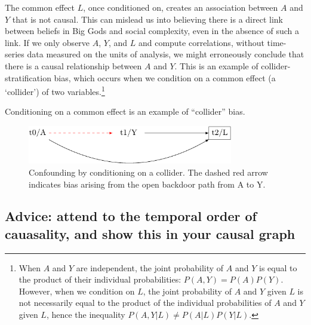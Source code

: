 \documentclass[
  singlecolumn]{report}
\begin{document}
The common effect \(L\), once conditioned on, creates an association
between \(A\) and \(Y\) that is not causal. This can mislead us into
believing there is a direct link between beliefs in Big Gods and social
complexity, even in the absence of such a link. If we only observe
\(A\), \(Y\), and \(L\) and compute correlations, without time-series
data measured on the units of analysis, we might erroneously conclude
that there is a causal relationship between \(A\) and \(Y\). This is an
example of collider-stratification bias, which occurs when we condition
on a common effect (a `collider') of two variables.\footnote{When \(A\)
  and \(Y\) are independent, the joint probability of \(A\) and \(Y\) is
  equal to the product of their individual probabilities:
  \(P(A, Y) = P(A)P(Y)\). However, when we condition on \(L\), the joint
  probability of \(A\) and \(Y\) given \(L\) is not necessarily equal to
  the product of the individual probabilities of \(A\) and \(Y\) given
  \(L\), hence the inequality \(P(A, Y | L) \neq P(A | L)P(Y | L)\).}

Conditioning on a common effect is an example of ``collider'' bias.

\begin{figure}

{\centering \includegraphics[width=0.8\textwidth,height=\textheight]{causal-dags_files/figure-pdf/fig-dag-common-effect-1.pdf}

}

\caption{\label{fig-dag-common-effect}Confounding by conditioning on a
collider. The dashed red arrow indicates bias arising from the open
backdoor path from A to Y.}

\end{figure}

\hypertarget{advice-attend-to-the-temporal-order-of-cauasality-and-show-this-in-your-causal-graph}{%
\subsection{Advice: attend to the temporal order of cauasality, and show
this in your causal
graph}\label{advice-attend-to-the-temporal-order-of-cauasality-and-show-this-in-your-causal-graph}}
\end{document}
